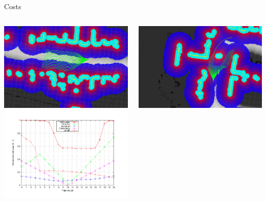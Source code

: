 \begin{frame}[plain]{Costs}
  \begin{columns}
    \begin{center}
      \includegraphics[width=\textwidth]{example4}\\
      \includegraphics[width=\textwidth,trim=50 40 80 60,clip]{costs4}
    \end{center}
    \begin{center}
      \includegraphics[width=\textwidth]{example17}\\

\end{center}
\end{columns}
\end{frame}
